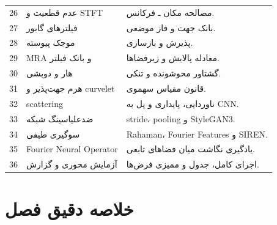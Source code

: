 \documentclass[12pt,openany,oneside]{book}
\begin{document}
\begin{videobox}
\begin{longtable}{p{}p{}p{}}
26 & عدم قطعیت و STFT & مصالحه مکان ـ فرکانس.\\
27 & فیلترهای گابور & بانک جهت و فاز موضعی.\\
28 & موجک پیوسته & پذیرش و بازسازی.\\
29 & MRA و بانک فیلتر & معادله پالایش و زیرفضاها.\\
30 & هار و دوبشی & گشتاور محوشونده و تنکی.\\
31 & هرم جهت‌پذیر و curvelet & قانون مقیاس سهموی.\\
32 & scattering & ناوردایی، پایداری و پل به CNN.\\
33 & ضدعلیاسینگ شبکه & stride، pooling و StyleGAN3.\\
34 & سوگیری طیفی & Rahaman، Fourier Features و SIREN.\\
35 & Fourier Neural Operator & یادگیری نگاشت میان فضاهای تابعی.\\
36 & آزمایش محوری و گزارش & اجرای کامل، جدول و ممیزی فرض‌ها.\\
\bottomrule
\end{longtable}
\end{videobox}

\section{خلاصه دقیق فصل}
\end{document}
